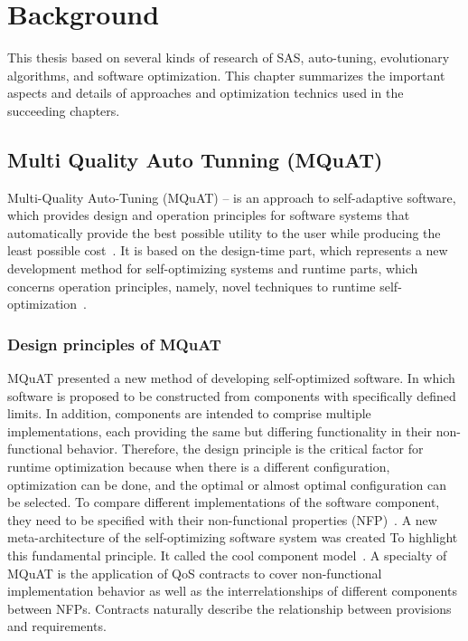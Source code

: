 \chapter{Background}
This thesis based on several kinds of research of SAS, auto-tuning, evolutionary algorithms, and software optimization. This chapter summarizes the important aspects and details of approaches and optimization technics used in the succeeding chapters.  

\section{Multi Quality Auto Tunning (MQuAT)}
Multi-Quality Auto-Tuning (MQuAT) – is an approach to self-adaptive software, which provides design and operation principles for software systems that automatically provide the best possible utility to the user while producing the least possible cost~\cite{gotz13}.
It is based on the design-time part, which represents a new development method for self-optimizing systems and runtime parts, which concerns operation principles, namely,  novel techniques to runtime self-optimization~\cite{gotz13}.

\subsection{Design principles of MQuAT}
MQuAT presented a new method of developing self-optimized software. In which software is proposed to be constructed from components with specifically defined limits. In addition, components are intended to comprise multiple implementations, each providing the same but differing functionality in their non-functional behavior. Therefore, the design principle is the critical factor for runtime optimization because when there is a different configuration, optimization can be done, and the optimal or almost optimal configuration can be selected. To compare different implementations of the software component, they need to be specified with their non-functional properties (NFP)~\cite{gotz13}.
A new meta-architecture of the self-optimizing software system was created To highlight this fundamental principle. It called the cool component model~\cite{gotz10}.
A specialty of MQuAT is the application of QoS contracts to cover non-functional implementation behavior as well as the interrelationships of different components between NFPs. Contracts naturally describe the relationship between provisions and requirements.

